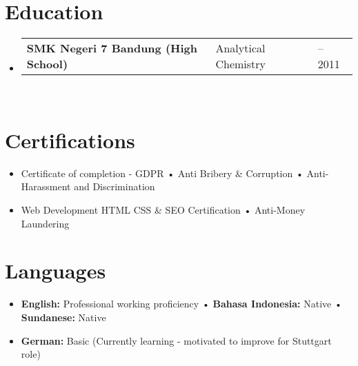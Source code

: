\documentclass[a4paper, 11pt]{article}
\newcommand{\resumeSubheading}[4]{
  \vspace{-2pt}\item
    \begin{tabularx}{0.987\textwidth}[t]{
  >{\raggedright\arraybackslash}X
  >{\centering\arraybackslash}X
  >{\raggedleft\arraybackslash}X }
      \textbf{#1} & #2 & #3 \\
    \end{tabularx}
    \textit{\small#4}\\
    \vspace{-7pt}
}
\newcommand{\resumeSubHeadingListStart}{\begin{itemize}[leftmargin=0.1in, label={}]}
\newcommand{\resumeSubHeadingListEnd}{\end{itemize}\vspace{5pt}}
\begin{document}
\section{Education}
    \resumeSubHeadingListStart
        \resumeSubheading
            {SMK Negeri 7 Bandung (High School)}{Analytical Chemistry}{2009 -- 2011}{}
    \resumeSubHeadingListEnd

\section{Certifications}
\vspace{2pt}
\small{
\begin{itemize}[leftmargin=0.15in, label=$\bullet$]
    \item Certificate of completion - GDPR • Anti Bribery \& Corruption • Anti-Harassment and Discrimination
    \item Web Development HTML CSS \& SEO Certification • Anti-Money Laundering
\end{itemize}
}
\vspace{5pt}

\section{Languages}
\vspace{2pt}
\small{
\begin{itemize}[leftmargin=0.15in, label=$\bullet$]
    \item \textbf{English:} Professional working proficiency • \textbf{Bahasa Indonesia:} Native • \textbf{Sundanese:} Native
    \item \textbf{German:} Basic (Currently learning - motivated to improve for Stuttgart role)
\end{itemize}
}
\end{document}
